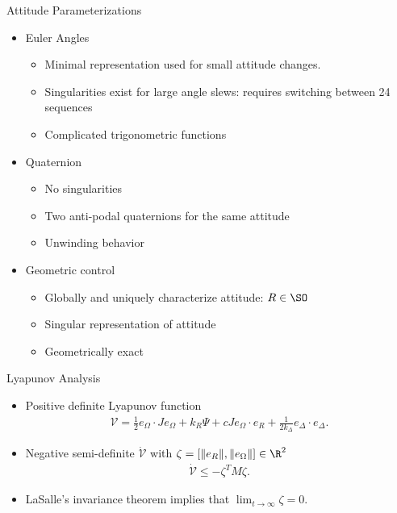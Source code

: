 \documentclass[11pt,professionalfonts]{beamer}
\begin{document}
\begin{frame}[noframenumbering,label=parameterizations]{Attitude Parameterizations}
	\begin{itemize}
		\item Euler Angles
		\begin{itemize}
			\item Minimal representation used for small attitude changes.
			\item Singularities exist for large angle slews: requires switching between 24 sequences
			\item Complicated trigonometric functions
		\end{itemize}
		\pause
		\item Quaternion 
		\begin{itemize}
			\item No singularities
			\item Two anti-podal quaternions for the same attitude
			\item Unwinding behavior 
		\end{itemize}
		\pause
		\item Geometric control
		\begin{itemize}
			\item Globally and uniquely characterize attitude: \( R \in \SO \)
			\item Singular representation of attitude 
			\item Geometrically exact
		\end{itemize}
	\end{itemize}
	
\end{frame}

\begin{frame}[noframenumbering,label=proof]{Lyapunov Analysis}
\begin{itemize}
	\item Positive definite Lyapunov function
	\begin{gather*}
		\mathcal{V} = \frac{1}{2} e_\Omega \cdot J e_\Omega + k_R \Psi + c J e_\Omega \cdot e_R + \frac{1}{2 k_\Delta} e_\Delta \cdot e_\Delta . \label{eqn:v_adapt}
	\end{gather*}
	\item Negative semi-definite \( \dot{\mathcal{V}} \) with \(\zeta=[\|e_R\|,\|e_\Omega\|]\in\R^2\)
	\begin{gather*}
		\dot{\mathcal{V}} \leq -\zeta^T M \zeta .
	\end{gather*}
	\item LaSalle's invariance theorem implies that \(\lim_{t\to\infty} \zeta=0\).
\end{itemize}
\end{frame}
\end{document}
